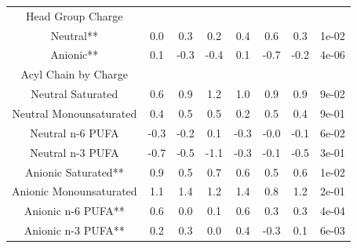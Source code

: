 \documentclass[9pt]{article}
\begin{document}
\begin{table}
{\begin{tabular}{| c || ccccc |cc|}
        \hline
Head Group Charge &&&&&&&\\
Neutral** &            0.0 &         0.3 &          0.2 &            0.4 &          0.6 &  0.3 &  1e-02 \\
Anionic** &            0.1 &        -0.3 &         -0.4 &            0.1 &         -0.7 & -0.2 &  4e-06 \\
        \hline
Acyl Chain by Charge &&&&&&&\\
Neutral Saturated    &            0.6 &         0.9 &          1.2 &            1.0 &          0.9 &  0.9 &  9e-02 \\
Neutral Monounsaturated     &            0.4 &         0.5 &          0.5 &            0.2 &          0.5 &  0.4 &  9e-01 \\
Neutral n-6 PUFA   &           -0.3 &        -0.2 &          0.1 &           -0.3 &         -0.0 & -0.1 &  6e-02 \\
Neutral n-3 PUFA    &           -0.7 &        -0.5 &         -1.1 &           -0.3 &         -0.1 & -0.5 &  3e-01 \\
Anionic Saturated**    &            0.9 &         0.5 &          0.7 &            0.6 &          0.5 &  0.6 &  1e-02 \\
Anionic Monounsaturated    &            1.1 &         1.4 &          1.2 &            1.4 &          0.8 &  1.2 &  2e-01 \\
Anionic n-6 PUFA**    &            0.6 &         0.0 &          0.1 &            0.6 &          0.3 &  0.3 &  4e-04 \\
Anionic n-3 PUFA**    &            0.2 &         0.3 &          0.0 &            0.4 &         -0.3 &  0.1 &  6e-03 \\
\hline

\end{tabular}}
\end{table}
\end{document}
